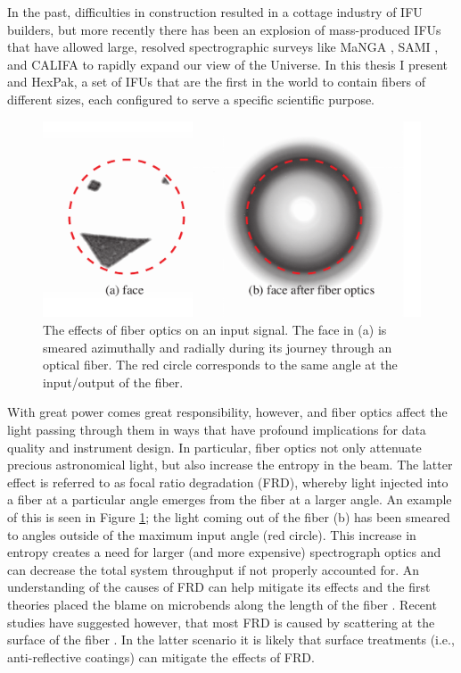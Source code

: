 In the past, difficulties in construction resulted in a cottage
industry of IFU builders, but more recently there has been an
explosion of mass-produced IFUs that have allowed large, resolved
spectrographic surveys like MaNGA \citep{Bundy15}, SAMI
\citep{Croom12}, and CALIFA \citep{Sanchez12} to rapidly expand our
view of the Universe. In this thesis I present \GP and HexPak, a set
of IFUs that are the first in the world to contain fibers of different
sizes, each configured to serve a specific scientific purpose.

\begin{figure}
  \centering
  \includegraphics[width=\textwidth]{Introduction/figs/FRDude.pdf}
  \caption[Face on FRD]{\fixspacing\label{intro:fig:FRDude}The effects
    of fiber optics on an input signal. The face in (a) is smeared
    azimuthally and radially during its journey through an optical
    fiber. The red circle corresponds to the same angle at the
    input/output of the fiber.}
\end{figure}

With great power comes great responsibility, however, and fiber optics
affect the light passing through them in ways that have profound
implications for data quality and instrument design. In particular,
fiber optics not only attenuate precious astronomical light, but also
increase the entropy in the beam. The latter effect is referred to as
focal ratio degradation (FRD), whereby light injected into a fiber at
a particular angle emerges from the fiber at a larger angle. An
example of this is seen in Figure \ref{intro:fig:FRDude}; the light
coming out of the fiber (b) has been smeared to angles outside of the
maximum input angle (red circle). This increase in entropy creates a
need for larger (and more expensive) spectrograph optics and can
decrease the total system throughput if not properly accounted for. An
understanding of the causes of FRD can help mitigate its effects and
the first theories placed the blame on microbends along the length of
the fiber \citep{Gloge72,Carrasco94}. Recent studies have suggested
however, that most FRD is caused by scattering at the surface of the
fiber \citep{Avila98,Haynes11,Eigenbrot12}. In the latter scenario it
is likely that surface treatments (i.e., anti-reflective coatings) can
mitigate the effects of FRD.

\clearpage
{} %



